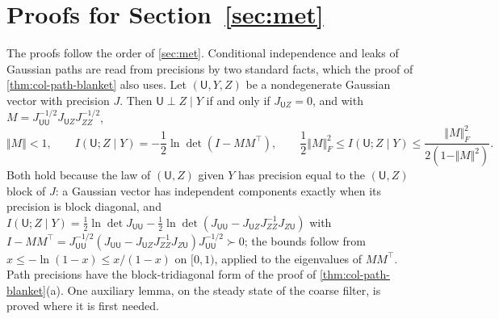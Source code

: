 \section{Proofs for \texorpdfstring{Section~\ref{sec:met}}{meta-agents as agents}}\label{app:met}

The proofs follow the order of \cref{sec:met}. Conditional independence and leaks of Gaussian paths are read from precisions by two standard facts, which the proof of \cref{thm:col-path-blanket} also uses. Let $(\mathsf U,Y,Z)$ be a nondegenerate Gaussian vector with precision $J$. Then $\mathsf U\perp Z\mid Y$ if and only if $J_{\mathsf UZ}=0$, and with $M=J_{\mathsf U\mathsf U}^{-1/2}J_{\mathsf UZ}J_{ZZ}^{-1/2}$,
\begin{equation}\label{eq:met-gaussian}
\Vert M\Vert<1,\qquad I(\mathsf U;Z\mid Y)=-\frac12\ln\det(I-MM^\top),\qquad\frac12\Vert M\Vert_F^2\le I(\mathsf U;Z\mid Y)\le\frac{\Vert M\Vert_F^2}{2(1-\Vert M\Vert^2)}.
\end{equation}
Both hold because the law of $(\mathsf U,Z)$ given $Y$ has precision equal to the $(\mathsf U,Z)$ block of $J$: a Gaussian vector has independent components exactly when its precision is block diagonal, and $I(\mathsf U;Z\mid Y)=\frac12\ln\det J_{\mathsf U\mathsf U}-\frac12\ln\det(J_{\mathsf U\mathsf U}-J_{\mathsf UZ}J_{ZZ}^{-1}J_{Z\mathsf U})$ with $I-MM^\top=J_{\mathsf U\mathsf U}^{-1/2}(J_{\mathsf U\mathsf U}-J_{\mathsf UZ}J_{ZZ}^{-1}J_{Z\mathsf U})J_{\mathsf U\mathsf U}^{-1/2}\succ0$; the bounds follow from $x\le-\ln(1-x)\le x/(1-x)$ on $[0,1)$, applied to the eigenvalues of $MM^\top$. Path precisions have the block-tridiagonal form of the proof of \cref{thm:col-path-blanket}(a). One auxiliary lemma, on the steady state of the coarse filter, is proved where it is first needed.

